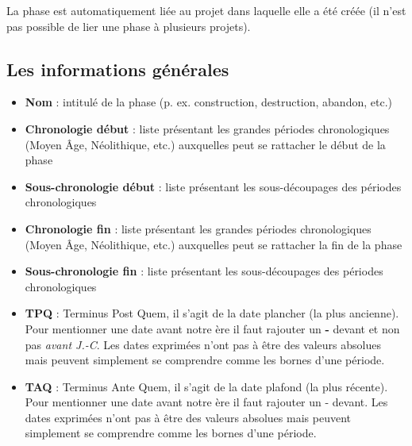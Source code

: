 \documentclass[letterpaper,10pt,french]{sphinxmanual}
\begin{document}
La phase est automatiquement liée au projet dans laquelle elle a été créée (il n'est pas possible de lier une phase à plusieurs projets).


\subsection{Les informations générales}
\label{manuel/formulaire_datation:les-informations-generales}\begin{itemize}
\item {} 
\textbf{Nom} : intitulé de la phase (p. ex. construction, destruction, abandon, etc.)

\item {} 
\textbf{Chronologie début} : liste présentant les grandes périodes chronologiques (Moyen Âge, Néolithique, etc.) auxquelles peut se rattacher le début de la phase

\item {} 
\textbf{Sous-chronologie début} : liste présentant les sous-découpages des périodes chronologiques

\item {} 
\textbf{Chronologie fin} : liste présentant les grandes périodes chronologiques (Moyen Âge, Néolithique, etc.) auxquelles peut se rattacher la fin de la phase

\item {} 
\textbf{Sous-chronologie fin} : liste présentant les sous-découpages des périodes chronologiques

\item {} 
\textbf{TPQ} : Terminus Post Quem, il s'agit de la date plancher (la plus ancienne). Pour mentionner une date avant notre ère il faut rajouter un \textbf{-} devant et non pas \emph{avant J.-C}. Les dates exprimées n'ont pas à être des valeurs absolues mais peuvent simplement se comprendre comme les bornes d'une période.

\item {} 
\textbf{TAQ} : Terminus Ante Quem, il s'agit de la date plafond (la plus récente). Pour mentionner une date avant notre ère il faut rajouter un - devant. Les dates exprimées n'ont pas à être des valeurs absolues mais peuvent simplement se comprendre comme les bornes d'une période.

\end{itemize}
\end{document}

